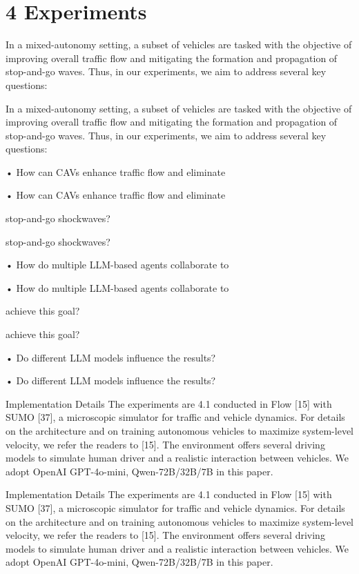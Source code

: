 \documentclass[12pt]{article}
\begin{document}
\section{4 Experiments}


In a mixed-autonomy setting, a subset of vehicles are
tasked with the objective of improving overall traffic
flow and mitigating the formation and propagation of
stop-and-go waves. Thus, in our experiments, we aim
to address several key questions:


In a mixed-autonomy setting, a subset of vehicles are
tasked with the objective of improving overall traffic
flow and mitigating the formation and propagation of
stop-and-go waves. Thus, in our experiments, we aim
to address several key questions:


• How can CAVs enhance traffic flow and eliminate


• How can CAVs enhance traffic flow and eliminate


stop-and-go shockwaves?


stop-and-go shockwaves?


• How do multiple LLM-based agents collaborate to


• How do multiple LLM-based agents collaborate to


achieve this goal?


achieve this goal?


• Do different LLM models influence the results?


• Do different LLM models influence the results?


Implementation Details The experiments are
4.1
conducted in Flow [15] with SUMO [37], a microscopic
simulator for traffic and vehicle dynamics. For details
on the architecture and on training autonomous vehicles
to maximize system-level velocity, we refer the readers
to [15]. The environment offers several driving models
to simulate human driver and a realistic interaction
between vehicles. We adopt OpenAI GPT-4o-mini,
Qwen-72B/32B/7B in this paper.


Implementation Details The experiments are
4.1
conducted in Flow [15] with SUMO [37], a microscopic
simulator for traffic and vehicle dynamics. For details
on the architecture and on training autonomous vehicles
to maximize system-level velocity, we refer the readers
to [15]. The environment offers several driving models
to simulate human driver and a realistic interaction
between vehicles. We adopt OpenAI GPT-4o-mini,
Qwen-72B/32B/7B in this paper.
\end{document}
